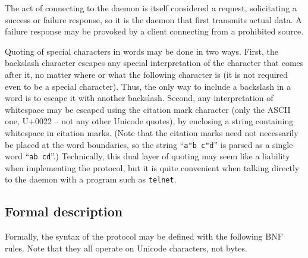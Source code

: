 \documentclass[twoside,a4paper,11pt]{article}
\begin{document}
The act of connecting to the daemon is itself considered a request,
solicitating a success or failure response, so it is the daemon that
first transmits actual data. A failure response may be provoked by a
client connecting from a prohibited source.

Quoting of special characters in words may be done in two ways. First,
the backslash character escapes any special interpretation of the
character that comes after it, no matter where or what the following
character is (it is not required even to be a special
character). Thus, the only way to include a backslash in a word is to
escape it with another backslash. Second, any interpretation of
whitespace may be escaped using the citation mark character (only the
ASCII one, U+0022 -- not any other Unicode quotes), by enclosing a
string containing whitespace in citation marks. (Note that the citation
marks need not necessarily be placed at the word boundaries, so the
string ``\texttt{a"b c"d}'' is parsed as a single word ``\texttt{ab
  cd}''.) Technically, this dual layer of quoting may seem like a
liability when implementing the protocol, but it is quite convenient
when talking directly to the daemon with a program such as
\texttt{telnet}.

\subsection{Formal description}

Formally, the syntax of the protocol may be defined with the following
BNF rules. Note that they all operate on Unicode characters, not bytes.
\end{document}
